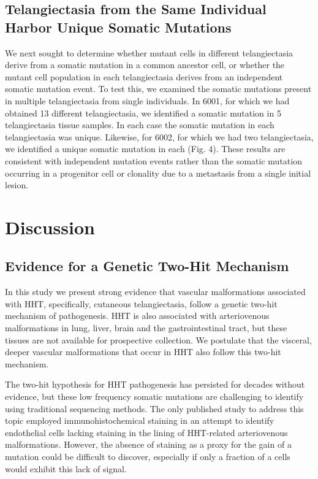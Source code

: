 \subsection{Telangiectasia from the Same Individual Harbor Unique Somatic Mutations}
We next sought to determine whether mutant cells in different telangiectasia derive from a somatic mutation in a common ancestor cell, or whether the mutant cell population in each telangiectasia derives from an independent somatic mutation event. To test this, we examined the somatic mutations present in multiple telangiectasia from single individuals. In 6001, for which we had obtained 13 different telangiectasia, we identified a somatic mutation in 5 telangiectasia tissue samples.  In each case the somatic mutation in each telangiectasia was unique. Likewise, for 6002, for which we had two telangiectasia, we identified a unique somatic mutation in each (Fig. 4). These results are consistent with independent mutation events rather than the somatic mutation occurring in a progenitor cell or clonality due to a metastasis from a single initial lesion. 

\section{Discussion}
\subsection{Evidence for a Genetic Two-Hit Mechanism}
In this study we present strong evidence that vascular malformations associated with HHT, specifically, cutaneous telangiectasia, follow a genetic two-hit mechanism of pathogenesis. HHT is also associated with arteriovenous malformations in lung, liver, brain and the gastrointestinal tract, but these tissues are not available for prospective collection.  We postulate that the visceral, deeper vascular malformations that occur in HHT also follow this two-hit mechanism.  

The two-hit hypothesis for HHT pathogenesis has persisted for decades without evidence, but these low frequency somatic mutations are challenging to identify using traditional sequencing methods.  The only published study to address this topic employed immunohistochemical staining in an attempt to identify endothelial cells lacking staining in the lining of HHT-related arteriovenous malformations.\citep{bourdeau2000} However, the absence of staining as a proxy for the gain of a mutation could be difficult to discover, especially if only a fraction of a cells would exhibit this lack of signal.

